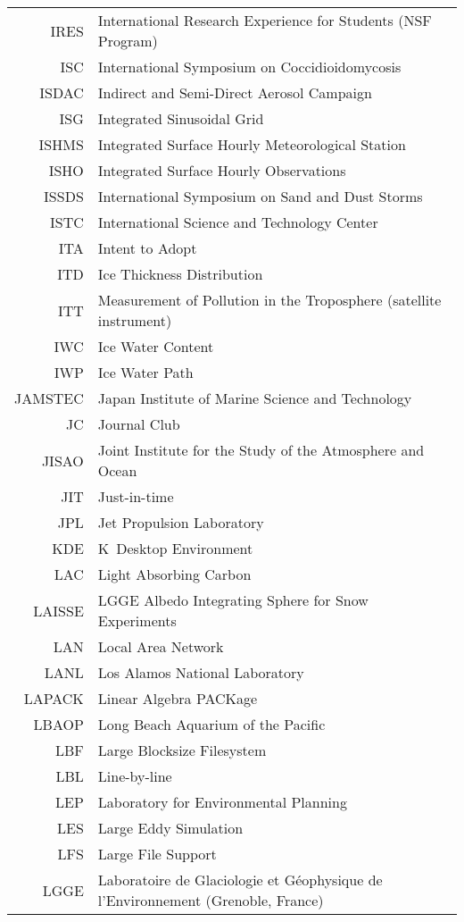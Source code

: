 \documentclass[12pt,twoside]{article}
\begin{document}
\begin{longtable}[>{\bfseries}l]{>{\ttfamily}r l}
IRES & International Research Experience for Students (NSF Program) \\
ISC & International Symposium on Coccidioidomycosis \\
ISDAC & Indirect and Semi-Direct Aerosol Campaign \\
ISG & Integrated Sinusoidal Grid \\
ISHMS & Integrated Surface Hourly Meteorological Station \\
ISHO & Integrated Surface Hourly Observations \\
ISSDS & International Symposium on Sand and Dust Storms \\
ISTC & International Science and Technology Center \\
ITA & Intent to Adopt \\
ITD & Ice Thickness Distribution \\
ITT & Measurement of Pollution in the Troposphere (satellite instrument) \\
IWC & Ice Water Content \\
IWP & Ice Water Path \\
JAMSTEC & Japan Institute of Marine Science and Technology \\
JC & Journal Club \\
JISAO & Joint Institute for the Study of the Atmosphere and Ocean \\
JIT & Just-in-time \\
JPL & Jet Propulsion Laboratory \\
KDE & K~Desktop Environment \\
LAC & Light Absorbing Carbon \\
LAISSE & LGGE Albedo Integrating Sphere for Snow Experiments \\
LAN & Local Area Network \\
LANL & Los Alamos National Laboratory \\
LAPACK & Linear Algebra PACKage \\
LBAOP & Long Beach Aquarium of the Pacific \\
LBF & Large Blocksize Filesystem \\
LBL & Line-by-line \\
LEP & Laboratory for Environmental Planning \\
LES & Large Eddy Simulation \\
LFS & Large File Support \\
LGGE & Laboratoire de Glaciologie et G\'{e}ophysique de l'Environnement (Grenoble, France) \\

\end{longtable}
\end{document}
